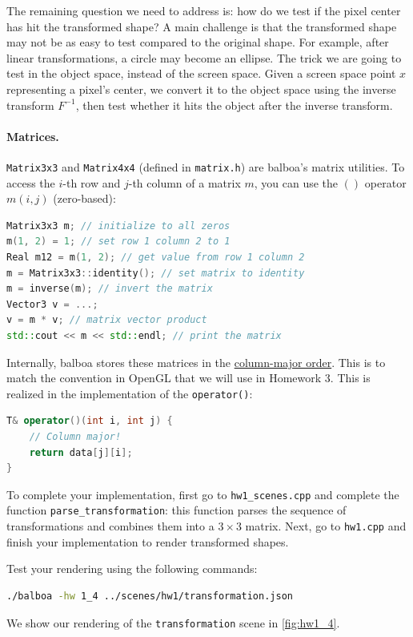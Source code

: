 The remaining question we need to address is: how do we test if the pixel center has hit the transformed shape? A main challenge is that the transformed shape may not be as easy to test compared to the original shape. For example, after linear transformations, a circle may become an ellipse. The trick we are going to test in the object space, instead of the screen space. Given a screen space point $x$ representing a pixel's center, we convert it to the object space using the inverse transform $F^{-1}$, then test whether it hits the object after the inverse transform. 

\paragraph{Matrices.} \lstinline{Matrix3x3} and \lstinline{Matrix4x4} (defined in \lstinline{matrix.h}) are balboa's matrix utilities. To access the $i$-th row and $j$-th column of a matrix $m$, you can use the $()$ operator $m(i, j)$ (zero-based):
\begin{lstlisting}[language=C++]
Matrix3x3 m; // initialize to all zeros
m(1, 2) = 1; // set row 1 column 2 to 1
Real m12 = m(1, 2); // get value from row 1 column 2
m = Matrix3x3::identity(); // set matrix to identity
m = inverse(m); // invert the matrix
Vector3 v = ...;
v = m * v; // matrix vector product
std::cout << m << std::endl; // print the matrix
\end{lstlisting}
Internally, balboa stores these matrices in the \href{https://en.wikipedia.org/wiki/Row-_and_column-major_order}{column-major order}. This is to match the convention in OpenGL that we will use in Homework 3. This is realized in the implementation of the \lstinline{operator()}:
\begin{lstlisting}[language=C++]
T& operator()(int i, int j) {
    // Column major!
    return data[j][i];
}
\end{lstlisting}

To complete your implementation, first go to \lstinline{hw1_scenes.cpp} and complete the function \lstinline{parse_transformation}: this function parses the sequence of transformations and combines them into a $3 \times 3$ matrix. Next, go to \lstinline{hw1.cpp} and finish your implementation to render transformed shapes.

Test your rendering using the following commands:
\begin{lstlisting}[language=bash]
  ./balboa -hw 1_4 ../scenes/hw1/transformation.json
\end{lstlisting}
We show our rendering of the \lstinline{transformation} scene in \cref{fig:hw1_4}. 

